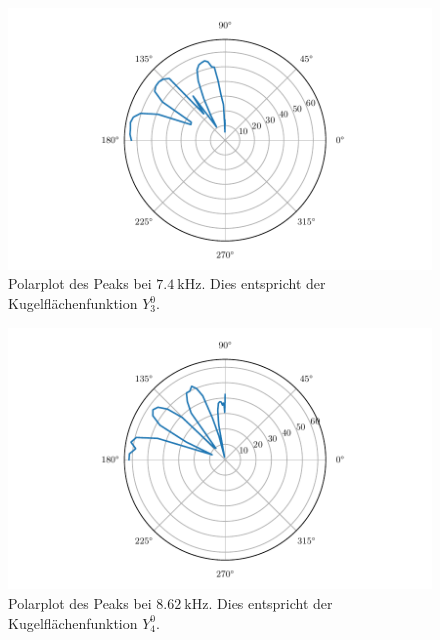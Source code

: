 \begin{figure}
    \centering
    \includegraphics{build/hvarangle74.pdf}
    \caption{Polarplot des Peaks bei $\qty{7.4}{\kilo\hertz}$. Dies entspricht der Kugelflächenfunktion $Y_3^0$.}
    \label{fig:hvarangle74}
\end{figure}
\begin{figure}
    \centering
    \includegraphics{build/hvarangle86.pdf}
    \caption{Polarplot des Peaks bei $\qty{8.62}{\kilo\hertz}$. Dies entspricht der Kugelflächenfunktion $Y_4^0$.}
    \label{fig:hvarangle86}
\end{figure}
\FloatBarrier


